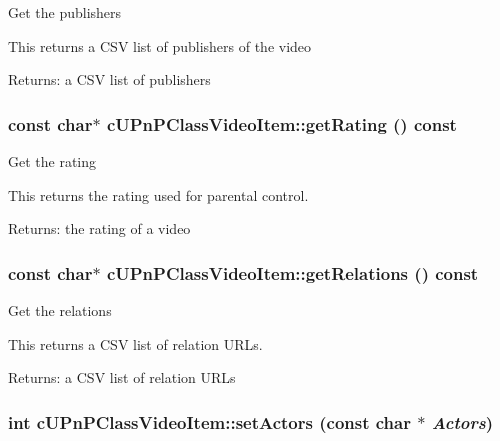 Get the publishers

This returns a CSV list of publishers of the video

\begin{Desc}
\item[Returns:]a CSV list of publishers \end{Desc}
\hypertarget{classcUPnPClassVideoItem_2d8b94809b1207a14831e095c2b598a6}{
\subsubsection[{getRating}]{\setlength{\rightskip}{0pt plus 5cm}const char$\ast$ cUPnPClassVideoItem::getRating () const}}
\label{classcUPnPClassVideoItem_2d8b94809b1207a14831e095c2b598a6}


Get the rating

This returns the rating used for parental control.

\begin{Desc}
\item[Returns:]the rating of a video \end{Desc}
\hypertarget{classcUPnPClassVideoItem_755e9710173d62fc2c9b98076391c916}{
\subsubsection[{getRelations}]{\setlength{\rightskip}{0pt plus 5cm}const char$\ast$ cUPnPClassVideoItem::getRelations () const}}
\label{classcUPnPClassVideoItem_755e9710173d62fc2c9b98076391c916}


Get the relations

This returns a CSV list of relation URLs.

\begin{Desc}
\item[Returns:]a CSV list of relation URLs \end{Desc}
\hypertarget{classcUPnPClassVideoItem_33b104046098dbf66d894143181678c4}{
\subsubsection[{setActors}]{\setlength{\rightskip}{0pt plus 5cm}int cUPnPClassVideoItem::setActors (const char $\ast$ {\em Actors})}}
\label{classcUPnPClassVideoItem_33b104046098dbf66d894143181678c4}


